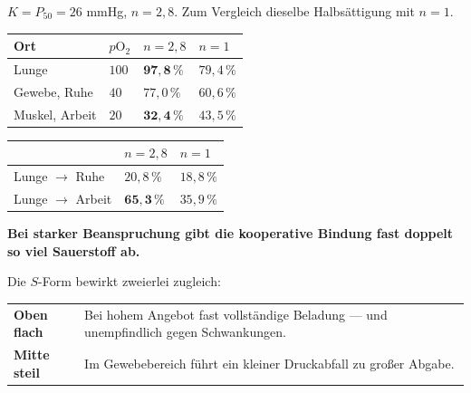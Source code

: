 \begin{merksatz}
$K = P_{50} = 26$ mmHg, $n = 2{,}8$. Zum Vergleich dieselbe Halbsättigung mit $n=1$.

\begin{center}
{\small
\renewcommand{\arraystretch}{1.48}
\begin{tabular}{@{}P{2.4cm}P{2.0cm}P{2.2cm}P{2.0cm}@{}}
\toprule
\textbf{Ort} & $p\mathrm{O}_2$ & $n = 2{,}8$ & $n = 1$\\
\midrule
Lunge & $100$ & $\mathbf{97{,}8\,\%}$ & $79{,}4\,\%$\\
Gewebe, Ruhe & $40$ & $77{,}0\,\%$ & $60{,}6\,\%$\\
Muskel, Arbeit & $20$ & $\mathbf{32{,}4\,\%}$ & $43{,}5\,\%$\\
\bottomrule
\end{tabular}}
\end{center}

\begin{center}
\renewcommand{\arraystretch}{1.48}
\begin{tabular}{@{}P{2.8cm}P{2.2cm}P{2.2cm}@{}}
\toprule
& $n = 2{,}8$ & $n = 1$\\
\midrule
Lunge $\to$ Ruhe & $20{,}8\,\%$ & $18{,}8\,\%$\\
Lunge $\to$ Arbeit & $\mathbf{65{,}3\,\%}$ & $35{,}9\,\%$\\
\bottomrule
\end{tabular}
\end{center}

\begin{center}
\begin{minipage}{0.9\textwidth}
\textbf{Bei starker Beanspruchung gibt die kooperative Bindung fast doppelt so viel Sauerstoff ab.}
\end{minipage}
\end{center}

Die $S$-Form bewirkt zweierlei zugleich:

\begin{center}
\renewcommand{\arraystretch}{1.5}
\begin{tabular}{@{}P{2.4cm}P{6.2cm}@{}}
\toprule
\textbf{Oben flach} & Bei hohem Angebot fast vollständige Beladung --- und unempfindlich gegen Schwankungen.\\
\textbf{Mitte steil} & Im Gewebebereich führt ein kleiner Druckabfall zu großer Abgabe.\\
\bottomrule
\end{tabular}
\end{center}


\end{merksatz}
